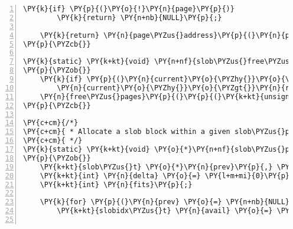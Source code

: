 \begin{Verbatim}[commandchars=\\\{\},numbers=left,firstnumber=1,stepnumber=1]
	\PY{k}{if} \PY{p}{(}\PY{o}{!}\PY{n}{page}\PY{p}{)}
		\PY{k}{return} \PY{n+nb}{NULL}\PY{p}{;}

	\PY{k}{return} \PY{n}{page\PYZus{}address}\PY{p}{(}\PY{n}{page}\PY{p}{)}\PY{p}{;}
\PY{p}{\PYZcb{}}

\PY{k}{static} \PY{k+kt}{void} \PY{n+nf}{slob\PYZus{}free\PYZus{}pages}\PY{p}{(}\PY{k+kt}{void} \PY{o}{*}\PY{n}{b}\PY{p}{,} \PY{k+kt}{int} \PY{n}{order}\PY{p}{)}
\PY{p}{\PYZob{}}
	\PY{k}{if} \PY{p}{(}\PY{n}{current}\PY{o}{\PYZhy{}}\PY{o}{\PYZgt{}}\PY{n}{reclaim\PYZus{}state}\PY{p}{)}
		\PY{n}{current}\PY{o}{\PYZhy{}}\PY{o}{\PYZgt{}}\PY{n}{reclaim\PYZus{}state}\PY{o}{\PYZhy{}}\PY{o}{\PYZgt{}}\PY{n}{reclaimed\PYZus{}slab} \PY{o}{+}\PY{o}{=} \PY{l+m+mi}{1} \PY{o}{\PYZlt{}}\PY{o}{\PYZlt{}} \PY{n}{order}\PY{p}{;}
	\PY{n}{free\PYZus{}pages}\PY{p}{(}\PY{p}{(}\PY{k+kt}{unsigned} \PY{k+kt}{long}\PY{p}{)}\PY{n}{b}\PY{p}{,} \PY{n}{order}\PY{p}{)}\PY{p}{;}
\PY{p}{\PYZcb{}}

\PY{c+cm}{/*}
\PY{c+cm}{ * Allocate a slob block within a given slob\PYZus{}page sp.}
\PY{c+cm}{ */}
\PY{k}{static} \PY{k+kt}{void} \PY{o}{*}\PY{n+nf}{slob\PYZus{}page\PYZus{}alloc}\PY{p}{(}\PY{k}{struct} \PY{n}{page} \PY{o}{*}\PY{n}{sp}\PY{p}{,} \PY{k+kt}{size\PYZus{}t} \PY{n}{size}\PY{p}{,} \PY{k+kt}{int} \PY{n}{align}\PY{p}{,} \PY{k+kt}{int} \PY{n}{apply}\PY{p}{,} \PY{k+kt}{int} \PY{o}{*}\PY{n}{best\PYZus{}fit}\PY{p}{)}
\PY{p}{\PYZob{}}
	\PY{k+kt}{slob\PYZus{}t} \PY{o}{*}\PY{n}{prev}\PY{p}{,} \PY{o}{*}\PY{n}{cur}\PY{p}{,} \PY{o}{*}\PY{n}{aligned} \PY{o}{=} \PY{n+nb}{NULL}\PY{p}{;}
	\PY{k+kt}{int} \PY{n}{delta} \PY{o}{=} \PY{l+m+mi}{0}\PY{p}{,} \PY{n}{units} \PY{o}{=} \PY{n}{SLOB\PYZus{}UNITS}\PY{p}{(}\PY{n}{size}\PY{p}{)}\PY{p}{;}
	\PY{k+kt}{int} \PY{n}{fits}\PY{p}{;}

	\PY{k}{for} \PY{p}{(}\PY{n}{prev} \PY{o}{=} \PY{n+nb}{NULL}\PY{p}{,} \PY{n}{cur} \PY{o}{=} \PY{n}{sp}\PY{o}{\PYZhy{}}\PY{o}{\PYZgt{}}\PY{n}{freelist}\PY{p}{;} \PY{p}{;} \PY{n}{prev} \PY{o}{=} \PY{n}{cur}\PY{p}{,} \PY{n}{cur} \PY{o}{=} \PY{n}{slob\PYZus{}next}\PY{p}{(}\PY{n}{cur}\PY{p}{)}\PY{p}{)} \PY{p}{\PYZob{}}
		\PY{k+kt}{slobidx\PYZus{}t} \PY{n}{avail} \PY{o}{=} \PY{n}{slob\PYZus{}units}\PY{p}{(}\PY{n}{cur}\PY{p}{)}\PY{p}{;}


\end{Verbatim}
